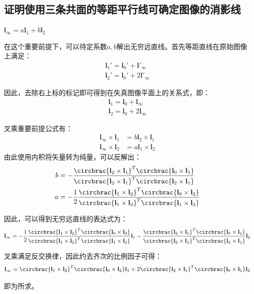 \documentclass[11pt]{article}
\begin{document}
\subsection{证明使用三条共面的等距平行线可确定图像的消影线}
$\mathbf{l_\infty}=a\mathbf{l}_1+b\mathbf{l}_2$\par
在这个重要前提下，可以待定系数$a,b$解出无穷远直线。首先等距直线在原始图像上满足：
\begin{align*}
  \mathbf{l}_1'=\mathbf{l}_0'+\mathbf{l'}_\infty \\
  \mathbf{l}_2'=\mathbf{l}_0'+2\mathbf{l'}_\infty
\end{align*}\par
因此，去除右上标的标记即可得到在失真图像平面上的关系式，即：
\begin{align*}
  \mathbf{l}_1=\mathbf{l}_0+{\mathbf{l}_\infty  } \\
  \mathbf{l}_2=\mathbf{l}_0+{2\mathbf{l}_\infty  }
\end{align*}\par
叉乘重要前提公式有：
\begin{align*}
  \mathbf{l}_\infty\times\mathbf{l}_1 & =b\mathbf{l}_2\times\mathbf{l}_1 \\
  \mathbf{l}_\infty\times\mathbf{l}_2 & =a\mathbf{l}_1\times\mathbf{l}_2
\end{align*}
由此使用内积将矢量转为纯量，可以反解出：
\begin{align*}
  b & =-\frac{\circbrac{\mathbf{l}_2\times\mathbf{l}_1}^T\circbrac{\mathbf{l}_0\times\mathbf{l}_1}}{\circbrac{\mathbf{l}_2\times\mathbf{l}_1}^T\circbrac{\mathbf{l}_2\times\mathbf{l}_1}}            \\
  a & =-\frac{1}{2}\frac{\circbrac{\mathbf{l}_1\times\mathbf{l}_2}^T\circbrac{\mathbf{l}_0\times\mathbf{l}_2}}{\circbrac{\mathbf{l}_1\times\mathbf{l}_2}^T\circbrac{\mathbf{l}_1\times\mathbf{l}_2}}
\end{align*}\par
因此，可以得到无穷远直线的表达式为：
\begin{equation*}
  \mathbf{l}_\infty=-\frac{1}{2}\frac{\circbrac{\mathbf{l}_1\times\mathbf{l}_2}^T\circbrac{\mathbf{l}_0\times\mathbf{l}_2}}{\circbrac{\mathbf{l}_1\times\mathbf{l}_2}^T\circbrac{\mathbf{l}_1\times\mathbf{l}_2}}\mathbf{l}_1-\frac{\circbrac{\mathbf{l}_2\times\mathbf{l}_1}^T\circbrac{\mathbf{l}_0\times\mathbf{l}_1}}{\circbrac{\mathbf{l}_2\times\mathbf{l}_1}^T\circbrac{\mathbf{l}_2\times\mathbf{l}_1}}\mathbf{l}_2
\end{equation*}\par
叉乘满足反交换律，因此约去齐次的比例因子可得：
\begin{equation*}
  \mathbf{l}_\infty=\circbrac{\mathbf{l}_1\times\mathbf{l}_2}^T\circbrac{\mathbf{l}_0\times\mathbf{l}_2}\mathbf{l}_1+2\circbrac{\mathbf{l}_2\times\mathbf{l}_1}^T\circbrac{\mathbf{l}_0\times\mathbf{l}_1}\mathbf{l}_2
\end{equation*}\par
即为所求。
\end{document}

